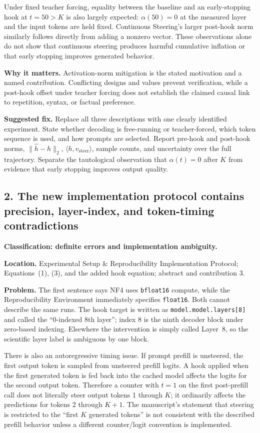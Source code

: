 \documentclass[11pt]{article}
\begin{document}
Under fixed teacher forcing, equality between the baseline and an early-stopping hook at $t=50>K$ is also largely expected: $\alpha(50)=0$ at the measured layer and the input tokens are held fixed.  Continuous Steering's larger post-hook norm similarly follows directly from adding a nonzero vector.  These observations alone do not show that continuous steering produces harmful cumulative inflation or that early stopping improves generated behavior.

\textbf{Why it matters.} Activation-norm mitigation is the stated motivation and a named contribution.  Conflicting designs and values prevent verification, while a post-hook offset under teacher forcing does not establish the claimed causal link to repetition, syntax, or factual preference.

\textbf{Suggested fix.} Replace all three descriptions with one clearly identified experiment.  State whether decoding is free-running or teacher-forced, which token sequence is used, and how prompts are selected.  Report pre-hook and post-hook norms, $\|\hat h-h\|_2$, $\langle h,v_{\text{steer}}\rangle$, sample counts, and uncertainty over the full trajectory.  Separate the tautological observation that $\alpha(t)=0$ after $K$ from evidence that early stopping improves output quality.

\subsection*{2. The new implementation protocol contains precision, layer-index, and token-timing contradictions}

\textbf{Classification: definite errors and implementation ambiguity.}

\textbf{Location.} Experimental Setup \& Reproducibility Implementation Protocol; Equations~(1), (3), and the added hook equation; abstract and contribution 3.

\textbf{Problem.} The first sentence says NF4 uses \texttt{bfloat16} compute, while the Reproducibility Environment immediately specifies \texttt{float16}.  Both cannot describe the same runs.  The hook target is written as \texttt{model.model.layers[8]} and called the ``0-indexed 8th layer''; index 8 is the ninth decoder block under zero-based indexing.  Elsewhere the intervention is simply called Layer~8, so the scientific layer label is ambiguous by one block.

There is also an autoregressive timing issue.  If prompt prefill is unsteered, the first output token is sampled from unsteered prefill logits.  A hook applied when the first generated token is fed back into the cached model affects the logits for the second output token.  Therefore a counter with $t=1$ on the first post-prefill call does not literally steer output tokens 1 through $K$; it ordinarily affects the predictions for tokens 2 through $K+1$.  The manuscript's statement that steering is restricted to the ``first $K$ generated tokens'' is not consistent with the described prefill behavior unless a different counter/logit convention is implemented.
\end{document}
